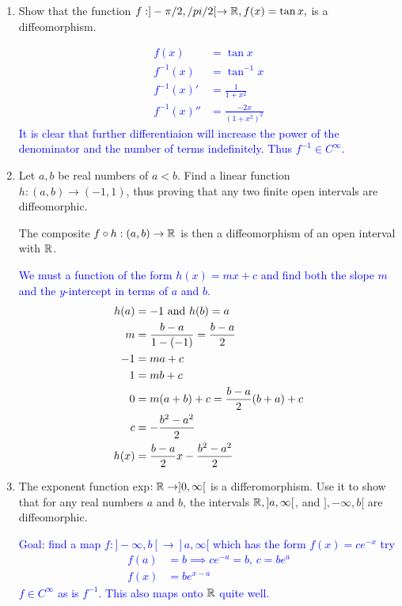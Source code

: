 \documentclass[10pt,a4paper]{report}
\newcommand{\BLUE}[1]{\textcolor{blue}{#1}}
\begin{document}
\begin{enumerate}[label=(\alph*)]
\item Show that the function $f: ] -\pi/2, /pi/2[ \to \mathbb{R},f(x)=\tan x,$ is a diffeomorphism.

\BLUE{\begin{align*}
	f(x) &= \tan x \\
	f^{-1}(x) &= \tan^{-1} x \\
	f^{-1}(x)' &= \frac{1}{1+x^2} \\
	f^{-1}(x)'' &= \frac{-2x}{(1+x^2)^2} 
\end{align*}It is clear that further differentiaion will increase the power of the denominator and the number of terms indefinitely. Thus $f^{-1} \in C^\infty$.
}

\item Let $a,b$ be real numbers of $a < b$.  Find a linear function $h:(a,b)\to (-1,1)$, thus proving that any two finite open intervals are diffeomorphic.

The composite $f \circ h:(a,b)\to \mathbb{R}$ is then a diffeomorphism of an open interval with $\mathbb{R}$.

\BLUE{We must a function of the form $h(x)=mx+c$ and find both the slope $m$ and the $y$-intercept in terms of $a$ and $b$.
\begin{align*}
	h(a) &= -1 \text{ and } h(b) = a \\
	m &= \frac{b-a}{1-(-1)} = \frac{b-a}{2} \\
	-1 &= ma + c \\
	1 &= mb + c \\
	0 &= m(a+b) + c = \frac{b-a}{2}(b+a) + c\\
	c &= -\frac{b^2-a^2}{2} \\
	h(x) &= \frac{b-a}{2}x - \frac{b^2-a^2}{2}
\end{align*}
}

\item The exponent function exp$:\mathbb{R} \to ]0,\infty[$ is a differomorphism.  Use it to show that for any real numbers $a$ and $b$, the intervals $\mathbb{R},]a,\infty[$, and $],-\infty,b[$ are diffeomorphic.

\BLUE{Goal: find a map $f: ]-\infty, b[ \to ]a, \infty[$ which has the form $f(x) = ce ^{-x}$ try
\begin{align*}
	f(a) &= b \implies ce^{-a} = b,\, c=be^a\\
	f(x) &= be^{x-a}
\end{align*}$f \in C^\infty$ as is $f^{-1}$.  This also maps onto $\mathbb{R}$ quite well.
}

\end{enumerate}
\end{document}
